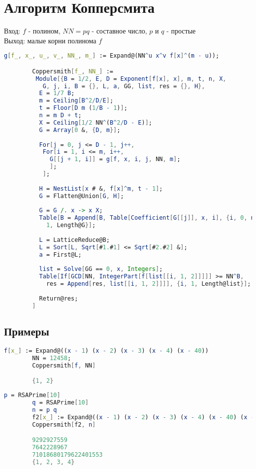 	\section{Алгоритм Копперсмита}
		Вход: $f$ - полином, $NN=p q$ - составное число, $p$ и $q$ - простые \\
		Выход: малые корни полинома $f$

		\begin{lstlisting}[language=Mathematica,caption={
      		Алгоритм Копперсмита
    	}]
		g[f_, x_, u_, v_, NN_, m_] := Expand@(NN^u x^v f[x]^(m - u));

		Coppersmith[f_, NN_] := 
		 Module[{B = 1/2, E, D = Exponent[f[x], x], m, t, n, X, 
		   G, j, i, B = {}, L, a, GG, list, res = {}, H},
		  E = 1/7 B;
		  m = Ceiling[B^2/D/E];
		  t = Floor[D m (1/B - 1)];
		  n = m D + t;
		  X = Ceiling[1/2 NN^(B^2/D - E)];
		  G = Array[0 &, {D, m}];
		  
		  For[j = 0, j <= D - 1, j++,
		   For[i = 1, i <= m, i++,
		     G[[j + 1, i]] = g[f, x, i, j, NN, m];
		     ];
		   ];
		  
		  H = NestList[x # &, f[x]^m, t - 1];
		  G = Flatten@Union[G, H];
		  
		  G = G /. x -> x X;
		  Table[B = Append[B, Table[Coefficient[G[[j]], x, i], {i, 0, n - 1}]];, {j, 
		    1, Length@G}];
		  
		  L = LatticeReduce@B;
		  L = Sort[L, Sqrt[#1.#1] <= Sqrt[#2.#2] &];
		  a = First@L;
		  
		  list = Solve[GG == 0, x, Integers];
		  Table[If[GCD[NN, IntegerPart[f[list[[i, 1, 2]]]]] >= NN^B, 
		    res = Append[res, list[[i, 1, 2]]]], {i, 1, Length@list}];
		  
		  Return@res;
		]
    	\end{lstlisting}

    	\subsection{Примеры}

    	\begin{lstlisting}[language=Mathematica,caption={
      		Пример	1
    	}]
		f[x_] := Expand@((x - 1) (x - 2) (x - 3) (x - 4) (x - 40))
		NN = 12458;
		Coppersmith[f, NN]

		{1, 2}
    	\end{lstlisting}

    	\begin{lstlisting}[language=Mathematica,caption={
      		Пример	2
    	}]
		p = RSAPrime[10]
		q = RSAPrime[10]
		n = p q
		f2[x_] := Expand@((x - 1) (x - 2) (x - 3) (x - 4) (x - 40) (x - 40) (x - 156) (x - 998))
		Coppersmith[f2, n]

		9292927559
		7642228967
		71018680179622401553
		{1, 2, 3, 4}
    	\end{lstlisting}

